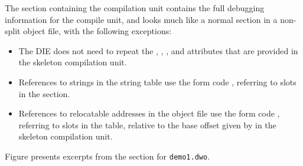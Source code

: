 The \dotdebuginfodwo{} section containing the compilation unit
contains the full debugging information for the compile unit, and
looks much like a normal \dotdebuginfo{} section in a non-split
object file, with the following exceptions:
\begin{itemize}
\item The \DWTAGcompileunit{} DIE does not need to repeat the
\DWATranges, \DWATlowpc, \DWAThighpc, and
\DWATstmtlist{} attributes that are provided in the skeleton
compilation unit.

\item References to strings in the string table use the 
form code \DWFORMstrx, referring to slots in the
\dotdebugstroffsetsdwo{} section.

\item References to relocatable addresses in the object file 
use the form code \DWFORMaddrx, referring to slots in the
\dotdebugaddr{} table, relative to the base offset given by
\DWATaddrbase{} in the skeleton compilation unit.
\end{itemize}

\vspace*{1mm}
Figure  presents
excerpts from the \dotdebuginfodwo{} section for \texttt{demo1.dwo}.

